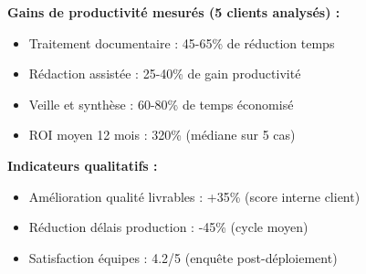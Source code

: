 \textbf{Gains de productivité mesurés (5 clients analysés) :}
\begin{itemize}
    \item Traitement documentaire : 45-65\% de réduction temps
    \item Rédaction assistée : 25-40\% de gain productivité
    \item Veille et synthèse : 60-80\% de temps économisé
    \item ROI moyen 12 mois : 320\% (médiane sur 5 cas)
\end{itemize}

\textbf{Indicateurs qualitatifs :}
\begin{itemize}
    \item Amélioration qualité livrables : +35\% (score interne client)
    \item Réduction délais production : -45\% (cycle moyen)
    \item Satisfaction équipes : 4.2/5 (enquête post-déploiement)
\end{itemize}
